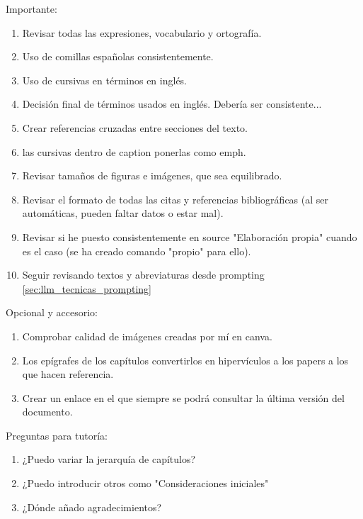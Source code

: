
\newpage
\pagecolor{yellow!30}
Importante:
  \begin{enumerate}
    \item Revisar todas las expresiones, vocabulario y ortografía.
    \item Uso de comillas españolas consistentemente.
    \item Uso de cursivas en términos en inglés.
    \item Decisión final de términos usados en inglés. Debería ser consistente...
    \item Crear referencias cruzadas entre secciones del texto.
    \item las cursivas dentro de caption ponerlas como emph.
    \item Revisar tamaños de figuras e imágenes, que sea equilibrado.
    \item Revisar el formato de todas las citas y referencias bibliográficas (al ser automáticas, pueden faltar datos o estar mal).
    \item Revisar si he puesto consistentemente en source "Elaboración propia" cuando es el caso (se ha creado comando "propio" para ello).
    \item Seguir revisando textos y abreviaturas desde prompting \ref{sec:llm_tecnicas_prompting}
  \end{enumerate}

  
  Opcional y accesorio:
  \begin{enumerate}
    \item Comprobar calidad de imágenes creadas por mí en canva.
    \item Los epígrafes de los capítulos convertirlos en hipervículos a los papers a los que hacen referencia.
    \item Crear un enlace en el que siempre se podrá consultar la última versión del documento.
  \end{enumerate}




Preguntas para tutoría:
\begin{enumerate}
  \item ¿Puedo variar la jerarquía de capítulos?
  \item ¿Puedo introducir otros como "Consideraciones iniciales"
  \item ¿Dónde añado agradecimientos?
\end{enumerate}
\clearpage
\nopagecolor

